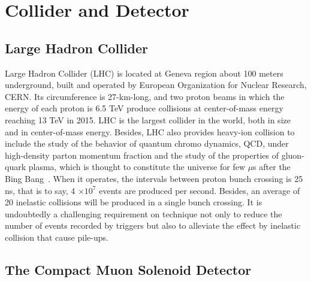 
\chapter{Collider and Detector} \label{chap:2}

\section{Large Hadron Collider}%
Large Hadron Collider (LHC) is located at Geneva region about 100 meters underground, built and operated by European Organization for Nuclear Research, CERN. 
Its circumference is 27-km-long, and two proton beams in which the energy of each proton is 6.5 TeV produce collisions at center-of-mass energy reaching 13 TeV in 2015. 
LHC is the largest collider in the world, both in size and in center-of-mass energy.
Besides, LHC also provides heavy-ion collision to include the study of the behavior of quantum chromo dynamics, QCD, under high-density parton momentum fraction and the study of the properties of gluon-quark plasma, which is thought to constitute the universe for few $\mu$s after the Bing Bang~\citep{Heavyions}. 
When it operates, the intervals between proton bunch crossing is 25 ns, that is to say,  4 $\times 10^7$ events are produced per second. 
Besides, an average of 20 inelastic collisions will be produced in a single bunch crossing.
It is undoubtedly a challenging requirement on technique not only to reduce the number of events recorded by triggers but also to alleviate the effect by inelastic collision that cause pile-ups.

\section{The Compact Muon Solenoid Detector}

